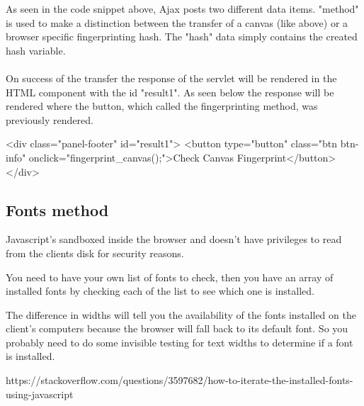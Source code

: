 As seen in the code snippet above, Ajax posts two different data items. "method" is used to make a distinction between the transfer of a canvas (like above) or a browser specific fingerprinting hash. The "hash" data simply contains the created hash variable.\\\\
On success of the transfer the response of the servlet will be rendered in the HTML component with the id "result1". As seen below the response will be rendered where the button, which called the fingerprinting method, was previously rendered.\\
\begin{HtmlCode}
	<div class="panel-footer" id="result1">
		<button type="button" class="btn btn-info"
		onclick="fingerprint_canvas();">Check Canvas Fingerprint</button>
	</div>
\end{HtmlCode}

\subsection{Fonts method} \label{sec:fonts}

Javascript's sandboxed inside the browser and doesn't have privileges to read from the clients disk for security reasons.

You need to have your own list of fonts to check, then you have an array of installed fonts by checking each of the list to see which one is installed.

The difference in widths will tell you the availability of the fonts installed on the client's computers because the browser will fall back to its default font. So you probably need to do some invisible testing for text widths to determine if a font is installed.

https://stackoverflow.com/questions/3597682/how-to-iterate-the-installed-fonts-using-javascript



